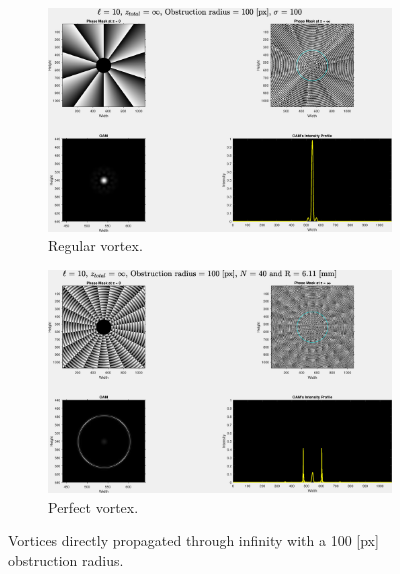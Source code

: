 \begin{figure}[htbp]
    \centering
    \begin{subfigure}[b]{0.45\textwidth}
        \centering
        \includegraphics[width=\textwidth]{images/c04/type=0_r=100_zi=0_zf=Inf.eps}
        \caption{Regular vortex.}
    \end{subfigure}
    \hfill
    \begin{subfigure}[b]{0.45\textwidth}
        \centering
        \includegraphics[width=\textwidth]{images/c04/type=1_r=100_zi=0_zf=Inf.eps}
        \caption{Perfect vortex.}
    \end{subfigure}
    \caption{Vortices directly propagated through infinity with a 100 [px] obstruction radius.}
    \label{fig:Vortices_r=100_z=inf}
\end{figure}

